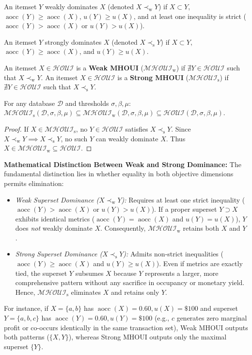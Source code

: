 \documentclass[runningheads]{llncs}
\newcommand{\HOUI}{\ensuremath{\mathcal{HOUI}}}
\newcommand{\MHOUIw}{\ensuremath{\mathcal{MHOUI}_{\mathrm{w}}}}
\newcommand{\MHOUI}{\ensuremath{\mathcal{MHOUI}_{\mathrm{s}}}}
\newcommand{\aocc}{\operatorname{aocc}}
\begin{document}
\begin{definition}
An itemset $Y$ weakly dominates $X$ (denoted $X \prec_{\mathrm{w}} Y$) if $X \subset Y$, $\aocc(Y) \ge \aocc(X)$, $u(Y) \ge u(X)$, and at least one inequality is strict ($\aocc(Y) > \aocc(X)$ or $u(Y) > u(X)$).
\end{definition}

\begin{definition}
An itemset $Y$ strongly dominates $X$ (denoted $X \prec_{\mathrm{s}} Y$) if $X \subset Y$, $\aocc(Y) \ge \aocc(X)$, and $u(Y) \ge u(X)$.
\end{definition}

\begin{definition}
An itemset $X \in \HOUI$ is a \textbf{Weak MHOUI} ($\MHOUIw$) if $\nexists Y \in \HOUI$ such that $X \prec_{\mathrm{w}} Y$. An itemset $X \in \HOUI$ is a \textbf{Strong MHOUI} ($\MHOUI$) if $\nexists Y \in \HOUI$ such that $X \prec_{\mathrm{s}} Y$.
\end{definition}

\begin{theorem}
\label{thm:inclusion}
For any database $\mathcal{D}$ and thresholds $\sigma, \beta, \mu$:
$\MHOUI(\mathcal{D}, \sigma, \beta, \mu) \subseteq \MHOUIw(\mathcal{D}, \sigma, \beta, \mu) \subseteq \HOUI(\mathcal{D}, \sigma, \beta, \mu)$.
\end{theorem}
\begin{proof}
If $X \in \MHOUI$, no $Y \in \HOUI$ satisfies $X \prec_{\mathrm{s}} Y$. Since $X \prec_{\mathrm{w}} Y \implies X \prec_{\mathrm{s}} Y$, no such $Y$ can weakly dominate $X$. Thus $X \in \MHOUIw \subseteq \HOUI$.
\end{proof}

\noindent
\textbf{Mathematical Distinction Between Weak and Strong Dominance:}
The fundamental distinction lies in whether equality in both objective dimensions permits elimination:
\begin{itemize}
    \item \emph{Weak Superset Dominance ($X \prec_{\mathrm{w}} Y$):} Requires at least one strict inequality ($\aocc(Y) > \aocc(X)$ or $u(Y) > u(X)$). If a proper superset $Y \supset X$ exhibits identical metrics ($\aocc(Y) = \aocc(X)$ and $u(Y) = u(X)$), $Y$ does \emph{not} weakly dominate $X$. Consequently, $\MHOUIw$ retains both $X$ and $Y$.
    \item \emph{Strong Superset Dominance ($X \prec_{\mathrm{s}} Y$):} Admits non-strict inequalities ($\aocc(Y) \ge \aocc(X)$ and $u(Y) \ge u(X)$). Even if metrics are exactly tied, the superset $Y$ subsumes $X$ because $Y$ represents a larger, more comprehensive pattern without any sacrifice in occupancy or monetary yield. Hence, $\MHOUI$ eliminates $X$ and retains only $Y$.
\end{itemize}
For instance, if $X = \{a, b\}$ has $\aocc(X) = 0.60, u(X) = \$100$ and superset $Y = \{a, b, c\}$ has $\aocc(Y) = 0.60, u(Y) = \$100$ (e.g., $c$ generates zero marginal profit or co-occurs identically in the same transaction set), Weak MHOUI outputs both patterns ($\{X, Y\}$), whereas Strong MHOUI outputs only the maximal superset $\{Y\}$.
\end{document}
